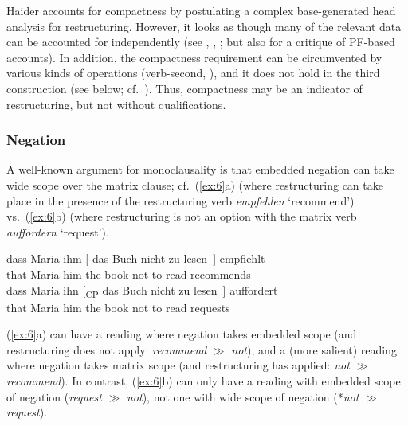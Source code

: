 \documentclass[output=paper]{langsci/langscibook}
\begin{document}
\ea\label{ex:5} 
\z
\z

Haider accounts for compactness by postulating a complex base-generated head
analysis for restructuring. However, it looks as though many of the relevant
data can be accounted for independently (see \citealt{Buering&Hartmann:96},
\cite{Wurmbrand:07}, \textcite[ch.~3]{Mueller:14:buf}; but also
\cite{Haider:16:com} for a critique of PF-based accounts). In addition, the
compactness requirement can be circumvented by various kinds of 
operations (verb-second, ), and it does not hold in the third
construction (see below; cf.\  \cite{Wurmbrand:07}). Thus, compactness may be an
indicator of restructuring, but not without qualifications.


\subsubsection{\label{m6}Negation}

A well-known argument for monoclausality is that embedded negation can take
wide scope over the matrix clause; cf.\ (\ref{ex:6}a) (where restructuring can
take place in the presence of the restructuring verb {\it empfehlen}
\enquote*{recommend}) vs.\ (\ref{ex:6}b) (where restructuring is not an option with the
matrix verb {\it auffordern} \enquote*{request}).

\ea\label{ex:6} 
\ea \gll dass \label{negw3}Maria ihm [ das Buch nicht zu lesen~] empfiehlt\\
that Maria\textsubscript{\Nom} him\textsubscript{\Dat} {} the book\textsubscript{\Acc} not to read recommends\\
\ex \gll dass Maria ihn [\textsubscript{CP} das Buch nicht zu lesen~]  auffordert\\
that Maria\textsubscript{\Nom} him\textsubscript{\Acc} {} the book\textsubscript{\Acc} not to read requests\\
\z
\z

(\ref{ex:6}a) can have a reading where negation takes embedded scope
(and restructuring does not apply: {\it recommend} $\gg$ {\it not}), and a
(more salient) reading where negation takes matrix scope (and restructuring
has applied: {\it not} $\gg$ {\it recommend}). In contrast, (\ref{ex:6}b) can only have a
reading with embedded scope of negation ({\it request} $\gg$ {\it
  not}), not one with wide scope of negation (*{\it not} $\gg$ {\it
  request}).
\end{document}
